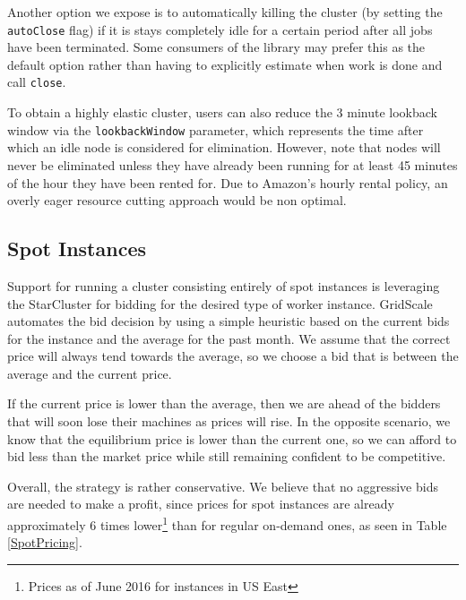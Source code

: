 Another option we expose is to automatically killing the cluster (by setting the \verb|autoClose| flag) if it is stays completely idle for a certain period after all jobs have been terminated. Some consumers of the library may prefer this as the default option rather than having to explicitly estimate when work is done and call \verb|close|.

To obtain a highly elastic cluster, users can also reduce the 3 minute lookback window via the \verb|lookbackWindow| parameter, which represents the time after which an idle node is considered for elimination. However, note that nodes will never be eliminated unless they have already been running for at least 45 minutes of the hour they have been rented for. Due to Amazon's hourly rental policy, an overly eager resource cutting approach would be non optimal.

\subsection{Spot Instances}

Support for running a cluster consisting entirely of spot instances is leveraging the StarCluster for bidding for the desired type of worker instance. GridScale automates the bid decision by using a simple heuristic based on the current bids for the instance and the average for the past month. We assume that the correct price will always tend towards the average, so we choose a bid that is between the average and the current price. 

If the current price is lower than the average, then we are ahead of the bidders that will soon lose their machines as prices will rise. In the opposite scenario, we know that the equilibrium price is lower than the current one, so we can afford to bid less than the market price while still remaining confident to be competitive.

Overall, the strategy is rather conservative. We believe that no aggressive bids are needed to make a profit, since prices for spot instances are already approximately 6 times lower\footnote{Prices as of June 2016 for instances in US East} than for regular on-demand ones, as seen in Table \ref{SpotPricing}.

